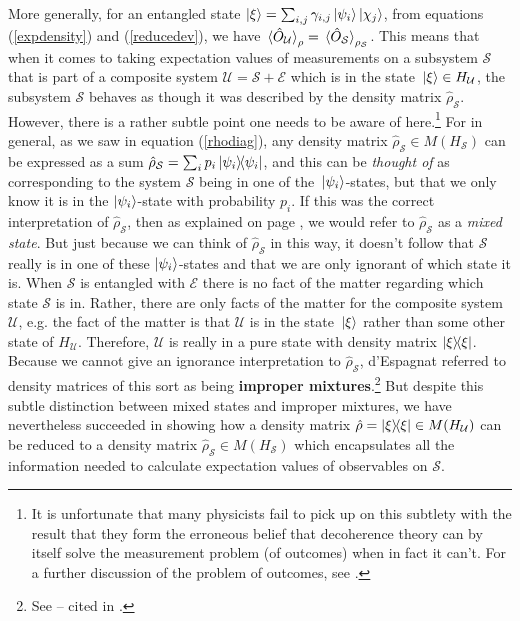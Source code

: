     More generally, \label{subtle}for an entangled state $\ket{\xi}=\sum_{i,j}\gamma_{i,j}\ket{\psi_i}\ket{\chi_j}$, from equations (\ref{expdensity}) and (\ref{reducedev}), we have  $\ev*{\hat{O}_\mathcal{U}}_\rho=\ev*{\hat{O}_\mathcal{S}}_{\rho_\mathcal{S}}$. This means that when it comes to taking expectation values of measurements on a subsystem $\mathcal{S}$ that is part of a composite system $\mathcal{U}=\mathcal{S}+\mathcal{E}$ which is in the state $\ket*{\xi}\in H_\mathcal{U}$, the subsystem $\mathcal{S}$ behaves as though it was described by the density matrix $\hat{\rho}_\mathcal{S}$. However, there is a rather subtle point one needs to be aware of here.\footnote{It is unfortunate that many physicists fail to pick up on this subtlety with the result that they form the erroneous belief that decoherence theory can by itself solve the measurement problem (of outcomes) when in fact it can't. For a further discussion of the problem of outcomes, see \cite[57-60]{Schlosshauer}.} 
    For in general, as we saw in equation (\ref{rhodiag}),  any density matrix $\hat{\rho}_\mathcal{S}\in M(H_\mathcal{S})$ can be expressed as a sum $\hat{\rho}_\mathcal{S}=\sum_i p_i\dyad{\psi_i}$, and this can be \emph{thought of} as corresponding to the system $\mathcal{S}$ being in one of the $\ket*{\psi_i}$-states, but that we only know it is in the $\ket{\psi_i}$-state with probability $p_i$. If this was the correct interpretation of  $\hat{\rho}_\mathcal{S}$, then as explained on page \pageref{mixedstate}, we would refer to  $\hat{\rho}_\mathcal{S}$ as a \emph{mixed state}. But just because we can think of $\hat{\rho}_\mathcal{S}$ in this way, it doesn't follow that $\mathcal{S}$ really is in one of these $\ket{\psi_i}$-states and that we are only ignorant of which state it is. When $\mathcal{S}$ is entangled with $\mathcal{E}$ there is no fact of the matter regarding which state $\mathcal{S}$ is in. Rather, there are only facts of the matter for the composite system $\mathcal{U}$, e.g. the fact of the matter is that $\mathcal{U}$ is in the state $\ket*{\xi}$ rather than some other state of $H_\mathcal{U}$. Therefore, $\mathcal{U}$ is really in a pure state with density matrix $\dyad{\xi}$. Because we cannot give an ignorance interpretation to  $\hat{\rho}_\mathcal{S}$, d’Espagnat\label{Espagnat} referred to density matrices of this sort as being \textbf{improper mixtures}.\footnote{See \cite[ch. 6.2]{Espagnat} -- cited in \cite[p. 19]{Butterfield}.} But despite this subtle distinction between mixed states and improper mixtures, we have nevertheless succeeded in showing how a density matrix $\hat{\rho}=\dyad{\xi}\in M(H_\mathcal{U})$ can be reduced to a density matrix $\hat{\rho}_\mathcal{S}\in M(H_\mathcal{S})$ which encapsulates all the information needed to calculate expectation values of observables on $\mathcal{S}$.\label{subtleend} 
    
